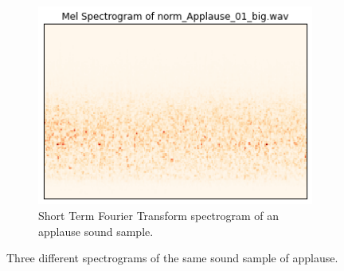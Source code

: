 \documentclass{sig-alternate-05-2015}
\begin{document}
\begin{figure}[hbt]
\begin{subfigure}[b]{0.3\textwidth}
      \centering
      \includegraphics[width=\textwidth]{figures/mel_applause.png}
      \caption{Short Term Fourier Transform spectrogram of an applause sound sample.}
      \label{fig:cqt-applause}
    \end{subfigure}
    
    \caption{Three different spectrograms of the same sound sample of applause.}
    \label{fig:spectrogramCompare}
  \end{figure}
  
\end{document}
